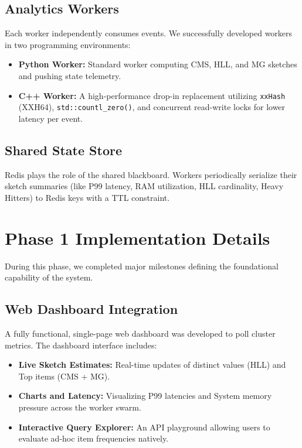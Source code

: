 \documentclass[12pt,a4paper]{article}
\begin{document}
\subsection{Analytics Workers}
Each worker independently consumes events. We successfully developed workers in two programming environments:
\begin{itemize}
    \item \textbf{Python Worker:} Standard worker computing CMS, HLL, and MG sketches and pushing state telemetry.
    \item \textbf{C++ Worker:} A high-performance drop-in replacement utilizing \texttt{xxHash} (XXH64), \texttt{std::countl\_zero()}, and concurrent read-write locks for lower latency per event. 
\end{itemize}

\subsection{Shared State Store}
Redis plays the role of the shared blackboard. Workers periodically serialize their sketch summaries (like P99 latency, RAM utilization, HLL cardinality, Heavy Hitters) to Redis keys with a TTL constraint.

\section{Phase 1 Implementation Details}
\label{sec:impl}

During this phase, we completed major milestones defining the foundational capability of the system.

\subsection{Web Dashboard Integration}
A fully functional, single-page web dashboard was developed to poll cluster metrics. The dashboard interface includes:
\begin{itemize}
    \item \textbf{Live Sketch Estimates:} Real-time updates of distinct values (HLL) and Top items (CMS + MG).
    \item \textbf{Charts and Latency:} Visualizing P99 latencies and System memory pressure across the worker swarm.
    \item \textbf{Interactive Query Explorer:} An API playground allowing users to evaluate ad-hoc item frequencies natively.
\end{itemize}
\end{document}
